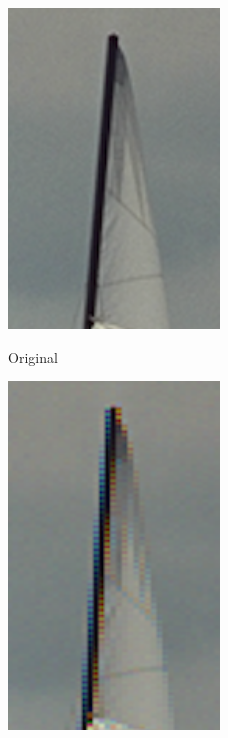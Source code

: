 {\begin{figure}[h]
\begin{center}
       \includegraphics[width=0.5\textwidth]{imagenes/img5_zippering_original.png}
        \caption{Original}
        \end{center}
\endminipage
{}
\begin{center}
       \includegraphics[width=0.5\textwidth]{imagenes/img5_zippering.png}
        \caption{}
         \end{center}
\endminipage
\end{figure}

}
